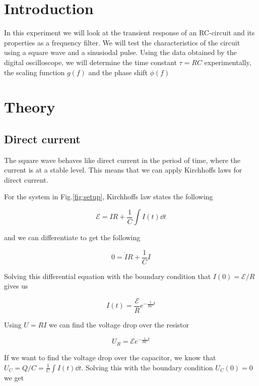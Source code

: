 \documentclass[../main/main.tex]{subfiles}
\begin{document}
\section*{Introduction}

In this experiment we will look at the transient response of an RC-circuit and its properties as a frequency filter.
We will test the characteristics of the circuit using a square wave and a sinusiodal pulse.
Using the data obtained by the digital oscilloscope, we will determine the time constant \( \tau = RC \) experimentally, the scaling function \( g(f) \) and the phase shift \( \phi(f) \)

\section*{Theory}

\subsection*{Direct current}

The square wave behaves like direct current in the period of time, where the current is at a stable level.
This means that we can apply Kirchhoffs laws for direct current.

For the system in Fig.\ref{fig:setup}, Kirchhoffs law states the following

\begin{equation}
  \mathcal{E} = IR+\frac{1}{C} \int I(t) \dd t
\end{equation}

and we can differentiate to get the following

\begin{equation}
  0 = \dot{I} R + \frac{1}{C} I
\end{equation}

Solving this differential equation with the boundary condition that \( I(0) = \mathcal{E} / R \) gives us

\begin{equation}
  I(t) = \frac{\mathcal{E}}{R} e^{-\frac{1}{RC} t}
\end{equation}

Using \( U = RI \) we can find the voltage drop over the resistor

\begin{equation}
  \label{lolleren}
  U_R = \mathcal{E} e^{-\frac{1}{RC} t}
\end{equation}

If we want to find the voltage drop over the capacitor, we know that \( U_C = Q / C = \frac{1}{C} \int I(t) \dd t \).
Solving this with the boundary condition \( U_C(0) = 0 \) we get
\end{document}
